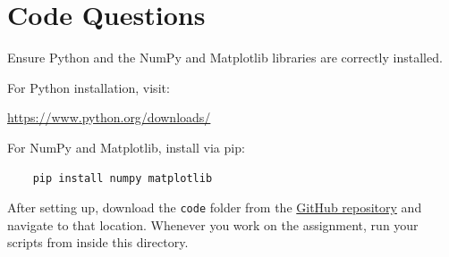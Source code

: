 \documentclass{16384_doc}
\begin{document}
\section{Code Questions}
  
Ensure Python and the
NumPy and Matplotlib libraries are correctly installed.

For Python installation, visit:
\begin{center}
    \href{https://www.python.org/downloads/}{https://www.python.org/downloads/}
\end{center}
For NumPy and Matplotlib, install via pip:
\begin{verbatim}
    pip install numpy matplotlib
\end{verbatim}

After setting up, download the \verb!code! folder from the \href{https://github.com/CMU-16384-2026-Fall/Assignment3}{GitHub repository} and navigate to that location. Whenever you work on the assignment, run your scripts from inside this directory.
\end{document}
